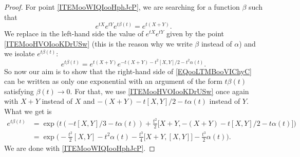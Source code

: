 \begin{proof}
	For point \ref{ITEMooWIQIooHphJcP}, we are searching for a function \( \beta\) such that
	\begin{equation}
		e^{tX} e^{tY} e^{t\beta(t)}= e^{t(X+Y)}.
	\end{equation}
	We replace in the left-hand side the value of \(  e^{tX} e^{tY}\) given by the point \ref{ITEMooHVOIooKDrUSw} (this is the reason why we write \( \beta\) instead of \( \alpha\)) and we isolate \(  e^{t\beta(t)}\):
	\begin{equation}        \label{EQooLTMBooVIChyC}
		e^{t\beta(t)}= e^{t(X+Y)} e^{-t(X+Y)-t^2[X,Y]/2-t^2\alpha(t)}.
	\end{equation}
	So now our aim is to show that the right-hand side of \eqref{EQooLTMBooVIChyC} can be written as only one exponential with an argument of the form \( t\beta(t)\) satisfying \( \beta(t)\to 0\). For that, we use \ref{ITEMooHVOIooKDrUSw} once again with \( X+Y\) instead of \( X\) and \( -(X+Y)-t[X,Y]/2-t\alpha(t)\) instead of \( Y\). What we get is
	\begin{subequations}
		\begin{align}
			e^{t\beta(t)} & =\exp\big( t(-t[X,Y]/3-t\alpha(t))+\frac{ t^2 }{2}\big[ X+Y,-(X+Y)-t[X,Y]/2-t\alpha(t) \big] \big)                        \\
			              & =\exp\big( -\frac{ t^2 }{2}[X,Y]  -t^2\alpha(t)-\frac{ t^3 }{ 4 }\big[ X+Y,[X,Y] \big]-\frac{ t^3 }{ 2 }\alpha(t)  \big).
		\end{align}
	\end{subequations}
	We are done with \ref{ITEMooWIQIooHphJcP}.

\end{proof}
